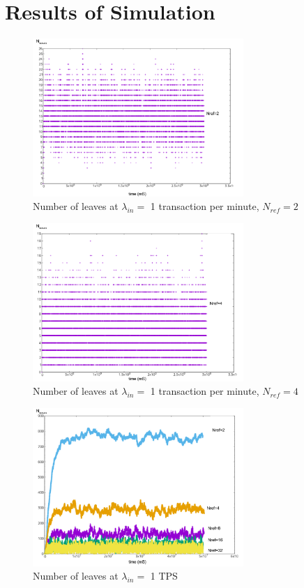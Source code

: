 \documentclass[a4paper,10pt,twocolumn]{article}
\begin{document}
\clearpage

\appendix
\section{Results of Simulation}
\label{ap1}

\begin{figure}[ht]
	\begin{center}
	\includegraphics[width=80mm]{1min_2.png}
	  \caption{Number of leaves at \( \lambda_{in}=\) 1 transaction per minute, \( N_{ref}=2\)}
	\label{fig:min1_2}
	\end{center}
 \end{figure}

 \begin{figure}[ht]
	\begin{center}
		\includegraphics[width=80mm]{1min_4.png}
		\caption{Number of leaves at \( \lambda_{in}=\) 1 transaction per minute, \( N_{ref}=4\)}
	  \label{fig:min1_4}
	\end{center}
 \end{figure}

 \begin{figure}[ht]
	\begin{center}
	\includegraphics[width=80mm]{1sec.png}
	  \caption{Number of leaves at \( \lambda_{in}=\) 1 TPS}
	\label{fig:sec1}
	\end{center}
 \end{figure}
\end{document}
